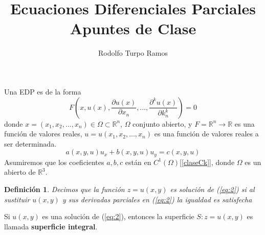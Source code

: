 \documentclass{article}
\title{Ecuaciones Diferenciales Parciales\\Apuntes de Clase}
\author{Rodolfo Turpo Ramos}
\date{\Today}
\newcommand{\R}{\mathbb R}
\newtheorem{definition}{Definición}
\begin{document}
\maketitle
\noindent Una EDP es de la forma
\begin{equation}\label{eq:1}
    F\left(x,u(x),\frac{\partial u(x)}{\partial x_n},...,\frac{\partial^k u(x)}{\partial k_n^k}\right)=0
\end{equation}
donde $x=(x_1,x_2,...,x_n)\in\Omega\subset\R^n$, $\Omega$ conjunto abierto, y $F=\R^n\rightarrow\R$ es una función de valores reales, $u=u(x_1,x_2,...,x_n)$ es una función de valores reales a ser determinada.
\begin{equation}\label{eq:2}
    a(x,y,u)u_x+b(x,y,u)u_y=c(x,y,u)
\end{equation}
Asumiremos que los coeficientes $a,b,c$ están en $C^1(\Omega)$[\ref{claseCk}], donde $\Omega$ es un abierto de $\R^3$.

\begin{definition}
    Decimos que la función $z=u(x,y)$ es solución de (\ref{eq:2}) si al sustituir $u(x,y)$ y sus derivadas parciales en (\ref{eq:2}) la igualdad es satisfecha
\end{definition}
Si $u(x,y)$ es una solución de (\ref{eq:2}), entonces la superficie $S:z=u(x,y)$ es llamada \textbf{superficie integral}.
\end{document}
